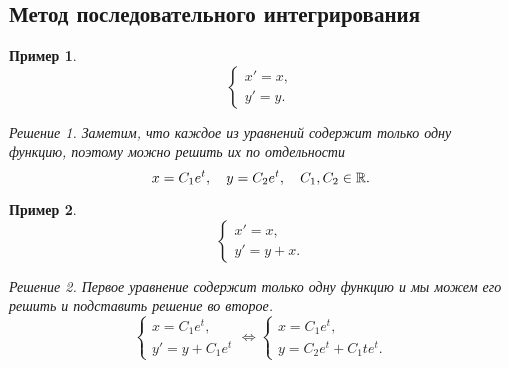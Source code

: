 \documentclass[a5paper, 11pt]{article}
\theoremstyle{definition}
\theoremstyle{plain}
\newtheorem{Ex}{Пример}
\theoremstyle{remark}
\newtheorem*{Solution}{Решение}
\begin{document}
	\subsection{Метод последовательного интегрирования}
	\begin{Ex}
		\[
		\begin{cases}
			x'=x,\\
			y'=y.
		\end{cases}
		\]
		\begin{Solution}
			Заметим, что каждое из уравнений содержит только одну функцию, поэтому можно решить их по отдельности
			\[
			x = C_1e^t, \quad y=C_2 e^t, \quad C_1, C_2 \in \mathbb{R}.
			\]
		\end{Solution}
	\end{Ex}
	\begin{Ex}
		\[
		\begin{cases}
			x'=x,\\
			y'=y+x.
		\end{cases}
		\]
		\begin{Solution}
			Первое уравнение содержит только одну функцию и мы можем его решить и подставить решение во второе.
			\[
			\begin{cases}
				x=C_1 e^t,\\
				y'=y+C_1e^t
			\end{cases}
			\Leftrightarrow
			\begin{cases}
				x=C_1 e^t,\\
				y = C_2e^t+C_1te^t.
			\end{cases}
			\]
		\end{Solution}
	\end{Ex}
\end{document}
